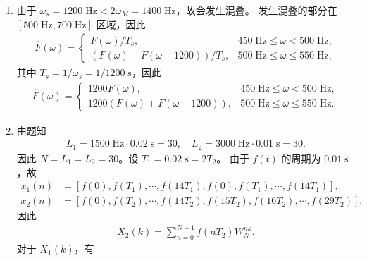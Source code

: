 \begin{solution}
    \begin{enumerate}[label=(\arabic*)]
        \item 由于 $\omega_s = 1200\;\mathrm{Hz} < 2\omega_M = 1400\;\mathrm{Hz}$，故会发生混叠。
            发生混叠的部分在 $[500\;\mathrm{Hz}, 700\;\mathrm{Hz}]$ 区域，因此
            \begin{align*}
                \hat{F}(\omega) = \begin{cases}
                    F(\omega)/T_s, & 450\;\mathrm{Hz} \le \omega < 500\;\mathrm{Hz}, \\
                    \left(F(\omega) + F(\omega - 1200)\right)/T_s, & 500\;\mathrm{Hz} \le \omega \le 550\;\mathrm{Hz},
                \end{cases}
            \end{align*}
            其中 $T_s = 1 / \omega_s = 1 / 1200\;\mathrm{s}$，因此
            \begin{align*}
                \hat{F}(\omega) = \begin{cases}
                    1200F(\omega), & 450\;\mathrm{Hz} \le \omega < 500\;\mathrm{Hz}, \\
                    1200\left(F(\omega) + F(\omega - 1200)\right), & 500\;\mathrm{Hz} \le \omega \le 550\;\mathrm{Hz}.
                \end{cases}
            \end{align*}
        \item 由题知
            \begin{align*}
                L_1 = 1500\;\mathrm{Hz} \cdot 0.02\;\mathrm{s} = 30, \quad
                L_2 = 3000\;\mathrm{Hz} \cdot 0.01\;\mathrm{s} = 30.
            \end{align*}
            因此 $N = L_1 = L_2 = 30$。设 $T_1 = 0.02\;\mathrm{s} = 2T_2$。
            由于 $f(t)$ 的周期为 $0.01\;\mathrm{s}$，故
            \begin{align*}
                x_1(n) & = [f(0), f(T_1), \cdots, f(14T_1), f(0), f(T_1), \cdots, f(14T_1)], \\
                x_2(n) & = [f(0), f(T_2), \cdots, f(14T_2), f(15T_2), f(16T_2), \cdots, f(29T_2)].
            \end{align*}
            因此
            \begin{align*}
                X_2(k) = \sum_{n = 0}^{N - 1}f(nT_2)W_N^{nk}.
            \end{align*}
            对于 $X_1(k)$，有
            \begin{align*}

\end{align*}
\end{enumerate}
\end{solution}
